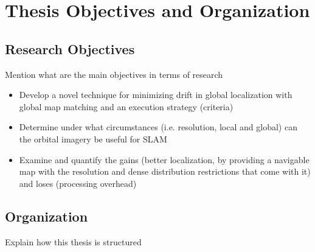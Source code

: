 \section{Thesis Objectives and Organization}

\subsection{Research Objectives}

Mention what are the main objectives in terms of research

\begin{itemize}
    \item Develop a novel technique for minimizing drift in global localization with global map matching and an execution strategy (criteria)
    \item Determine under what circumstances (i.e. resolution, local and global) can the orbital imagery be useful for SLAM
    \item Examine and quantify the gains (better localization, by providing a navigable map with the resolution and dense distribution restrictions that come with it) and loses (processing overhead)
\end{itemize}

\subsection{Organization}

Explain how this thesis is structured

